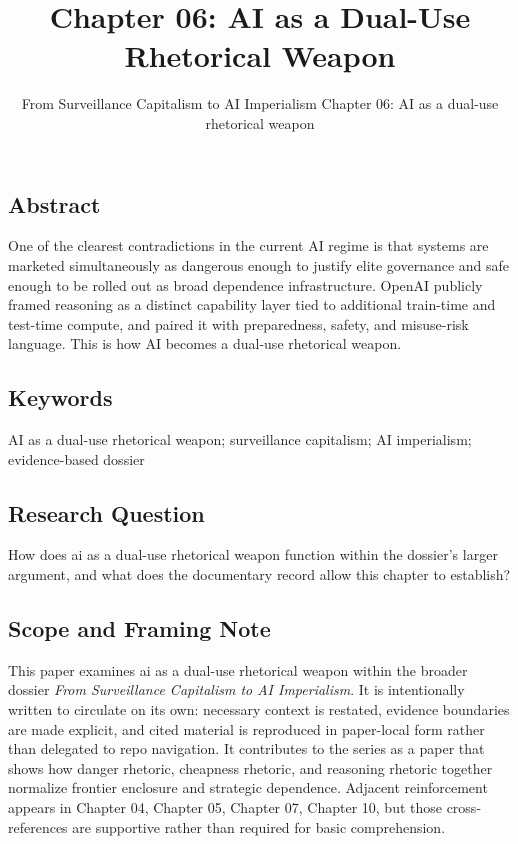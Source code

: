 \documentclass[
  american,
  11pt,
  letterpaper,
]{article}
\title{Chapter 06: AI as a Dual-Use Rhetorical Weapon}
\subtitle{From Surveillance Capitalism to AI Imperialism \textbar{}
Chapter 06: AI as a dual-use rhetorical weapon}
\author{}
\date{}
\begin{document}
\maketitle

\subsection{Abstract}\label{abstract}

One of the clearest contradictions in the current AI regime is that
systems are marketed simultaneously as dangerous enough to justify elite
governance and safe enough to be rolled out as broad dependence
infrastructure. OpenAI publicly framed reasoning as a distinct
capability layer tied to additional train-time and test-time compute,
and paired it with preparedness, safety, and misuse-risk language. This
is how AI becomes a dual-use rhetorical weapon.

\subsection{Keywords}\label{keywords}

AI as a dual-use rhetorical weapon; surveillance capitalism; AI
imperialism; evidence-based dossier

\subsection{Research Question}\label{research-question}

How does ai as a dual-use rhetorical weapon function within the
dossier's larger argument, and what does the documentary record allow
this chapter to establish?

\subsection{Scope and Framing Note}\label{scope-and-framing-note}

This paper examines ai as a dual-use rhetorical weapon within the
broader dossier \emph{From Surveillance Capitalism to AI Imperialism}.
It is intentionally written to circulate on its own: necessary context
is restated, evidence boundaries are made explicit, and cited material
is reproduced in paper-local form rather than delegated to repo
navigation. It contributes to the series as a paper that shows how
danger rhetoric, cheapness rhetoric, and reasoning rhetoric together
normalize frontier enclosure and strategic dependence. Adjacent
reinforcement appears in Chapter 04, Chapter 05, Chapter 07, Chapter 10,
but those cross-references are supportive rather than required for basic
comprehension.
\end{document}
